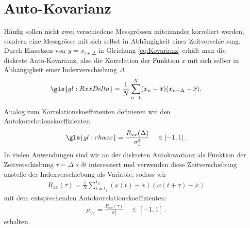 \section{Auto-Kovarianz}
\label{chap:korrelation:sec:autokovarianz}


Häufig sollen nicht zwei verschiedene Messgrössen miteinander korreliert werden, sondern eine Messgrösse mit sich selbst in Abhängigkeit einer Zeitverschiebung. Durch Einsetzen von $y = x_{i+\Delta}$ in Gleichung \ref{eq:Kovarianz}  erhält man die diskrete Auto-Kovarianz, also die Korrelation der Funktion $x$ mit sich selber in Abhängigkeit einer Indexverschiebung $\Delta$
\begin{align}
\gls{gl:RxxDelta} = \frac{1}{N} \sum_{n = 1}^N (x_n - \overline{x})(x_{n+\Delta} - \overline{x}). \label{eq:AutokovarianzDeskret}
\end{align}

Analog zum Korrelationskoeffizienten definieren wir den Autokorrelationskoeffizienten
\begin{align}
\gls{gl:rhoxx} = \frac{ R_{xx} (\Delta) }{ \sigma_x^2 } \quad \in [-1,1]\,.
\end{align}
In vielen Anwendungen sind wir an der diskreten Autokovarianz als Funktion der Zeitverschiebung $\tau = \Delta \times \delta t$ interessiert und verwenden diese Zeitverschiebung anstelle der Indexverschiebung als Variable, sodass wir 
\begin{align}
R_{xx} (\tau) = \frac{1}{N} \sum_{t = t_1}^{t_N} (x(t) - \overline{x})(x(t + \tau) - \overline{x})
\end{align}
mit dem entsprechenden Autokorrelationskoeffizienten:
\begin{align}
\rho_{xx} = \frac{ R_{xx} (\tau) }{ \sigma_x^2 } \quad \in [-1,1]\,.
\end{align}
erhalten. \\


